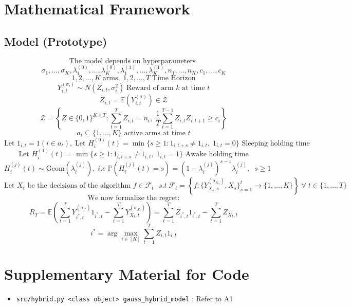 \documentclass{article}
\begin{document}
\section{Mathematical Framework}

\subsection{Model (Prototype)}
$$\text{The model depends on hyperparameters }$$
$$\sigma_1, \ldots ,\sigma_K, \lambda_1^{(0)}, \ldots, \lambda_K^{(0)}, \lambda_1^{(1)}, \ldots, \lambda_K^{(1)}, n_1, \ldots, n_K, c_1, \ldots, c_K$$
$$1, 2, \ldots, K\; \text{arms}, \; 1, 2, \ldots, T\; \text{Time Horizon}$$
$$Y^{(\sigma_i)}_{i, t} \sim N(Z_{i, t}, \sigma_i^2)\; \text{Reward of arm $k$ at time $t$}$$
$$Z_{i, t} = \mathbb{E}(Y_{i, t}^{(\sigma)}) \in \mathcal{Z}$$
$$\mathcal{Z} = \left\{ Z \in \{0, 1\}^{K \times T} : \sum_{t=1}^T Z_{i, t} = n_i, \; \frac{1}{T}\sum_{t=1}^{T-1}Z_{i, t} Z_{i, t+1} \geq c_i \right\}$$
$$a_t \subseteq \{1, \ldots, K\} \text{ active arms at time }t$$
$$\text{Let }1_{i, t} = 1(i \in a_t), \; \text{Let }H_i^{(0)}(t) = \min\{s \geq 1: 1_{i, t+s} \neq 1_{i,t}, \; 1_{i,t} = 0\} \text{ Sleeping holding time}$$
$$\text{Let }H_i^{(1)}(t) = \min\{s \geq 1: 1_{i, t+s} \neq 1_{i, t}, \; 1_{i,t} = 1\} \text{ Awake holding time}$$
$$H_i^{(j)}(t) \sim \text{Geom}(\lambda_i^{(j)}), \;i.e\; \mathbb{P}(H_i^{(j)}(t) = s) = (1-\lambda^{(j)}_i)^{s-1}\lambda^{(j)}_i, \;\; s \geq 1$$
$$\text{Let }X_t \text{ be the decisions of the algorithm $f \in \mathcal{F}_t$ } s.t \; \mathcal{F}_t = \left\{f : \{Y_{X_s, s}^{(\sigma_{X_s})}, X_{s}\}_{s=1}^t \rightarrow \{1, \ldots, K\}\right\} \; \forall \; t\in\{1, \ldots, T\}$$
$$\text{We now formalize the regret:}$$
$$R_T = \mathbb{E}\left(\sum_{t=1}^T Y^{(\sigma_{i^*})}_{i^*, t} 1_{i^*, t} - \sum_{t=1}^T Y_{X_t, t}^{(\sigma_{X_t})}\right) = \sum_{t=1}^T Z_{i^*, t} 1_{i^*, t} - \sum_{t=1}^T Z_{X_t, t}$$
$$i^* = \arg\max_{i \in [K]} \sum_{t=1}^T Z_{i, t}1_{i, t}$$

\subsection{}

\section{Supplementary Material for Code}

\begin{itemize}
    \item \texttt{src/hybrid.py <class object> gauss\_hybrid\_model} : Refer to A1
\end{itemize}
\end{document}
